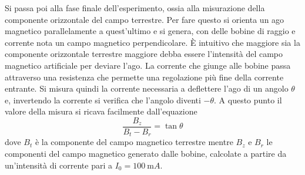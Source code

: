 \documentclass[a4paper,11pt]{article}
\begin{document}
	Si passa poi alla fase finale dell'esperimento, ossia alla misurazione della componente orizzontale del campo terrestre. Per fare questo si orienta un ago magnetico parallelamente a quest'ultimo e si genera, con delle bobine di raggio e corrente nota un campo magnetico perpendicolare. È intuitivo che maggiore sia la componente orizzontale terrestre maggiore debba essere l'intensità del campo magnetico artificiale per deviare l'ago. La corrente che giunge alle bobine passa attraverso una resistenza che permette una regolazione più fine della corrente entrante. Si misura quindi la corrente necessaria a deflettere l'ago di un angolo $\theta$ e, invertendo la corrente si verifica che l'angolo diventi $-	\theta$. A questo punto il valore della misura si ricava facilmente dall'equazione $$\frac{B_z}{B_t - B_r} = \tan \theta$$ dove $B_t$ è la componente del campo magnetico terrestre mentre $B _z$ e $B_ r$ le componenti del campo magnetico generato dalle bobine, calcolate a partire da un'intensità di corrente pari a $I _0 = \SI{100}{\milli A}$.
	
\end{document}
